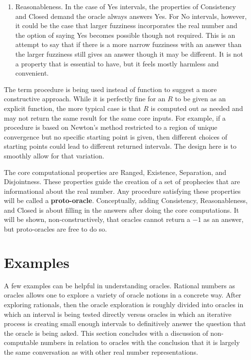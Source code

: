 \documentclass[12pt]{article}
\begin{document}
\begin{enumerate}
    \item Reasonableness. In the case of Yes intervals, the properties of Consistency and Closed demand the oracle always answers Yes. For No intervals, however, it could be the case that larger fuzziness incorporates the real number and the option of saying Yes becomes possible though not required. This is an attempt to say that if there is a more narrow fuzziness with an answer than the larger fuzziness still gives an answer though it may be different. It is not a property that is essential to have, but it feels mostly harmless and convenient. 

\end{enumerate}

The term procedure is being used instead of function to suggest a more constructive approach. While it is perfectly fine for an $R$ to be given as an explicit function, the more typical case is that $R$ is computed out as needed and may not return the same result for the same core inputs. For example, if a procedure is based on Newton's method restricted to a region of unique convergence but no specific starting point is given, then different choices of starting points could lead to different returned intervals. The design here is to smoothly allow for that variation. 

The core computational properties are Ranged, Existence, Separation, and Disjointness. These properties guide the creation of a set of prophecies that are informational about the real number. Any procedure satisfying these properties will be called a \textbf{proto-oracle}. Conceptually, adding Consistency, Reasonableness, and Closed is about filling in the answers after doing the core computations. It will be shown, non-constructively, that oracles cannot return a $-1$ as an answer, but proto-oracles are free to do so. 


\section{Examples}

A few examples can be helpful in understanding oracles. Rational numbers as oracles allows one to explore a variety of oracle notions in a concrete way. After exploring rationals, then the oracle exploration is roughly divided into oracles in which an interval is being tested directly versus oracles in which an iterative process is creating small enough intervals to definitively answer the question that the oracle is being asked. This section concludes with a discussion of non-computable numbers in relation to oracles with the conclusion that it is largely the same conversation as with other real number representations. 
\end{document}
